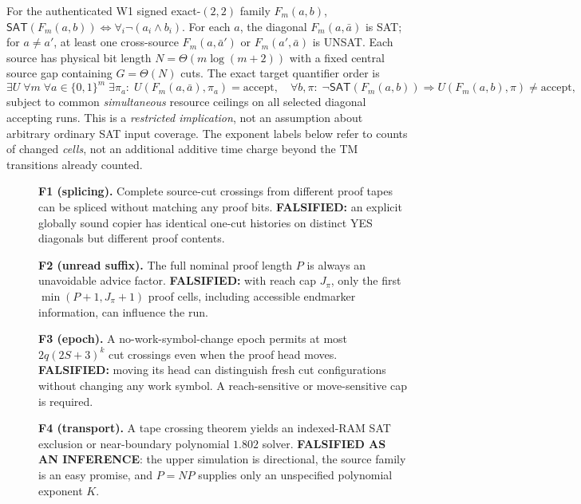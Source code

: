\documentclass[11pt]{article}
\newcommand{\SAT}{\mathsf{SAT}}
\begin{document}
For the authenticated W1 signed exact-$(2,2)$ family $F_m(a,b)$, $\SAT(F_m(a,b))\iff\forall_i\neg(a_i\land b_i)$. For each $a$, the diagonal $F_m(a,\bar a)$ is SAT; for $a\ne a'$, at least one cross-source $F_m(a,\bar a')$ or $F_m(a',\bar a)$ is UNSAT. Each source has physical bit length $N=\Theta(m\log(m+2))$ with a fixed central source gap containing $G=\Theta(N)$ cuts. The exact target quantifier order is
\[
\exists U\;\forall m\;\forall a\in\{0,1\}^m\;\exists\pi_a:\;
U(F_m(a,\bar a),\pi_a)=\mathrm{accept},
\quad \forall b,\pi:\;\neg\SAT(F_m(a,b))\Rightarrow U(F_m(a,b),\pi)\ne\mathrm{accept},
\]
subject to common \emph{simultaneous} resource ceilings on all selected diagonal accepting runs. This is a \emph{restricted implication}, not an assumption about arbitrary ordinary SAT input coverage. The exponent labels below refer to counts of changed \emph{cells}, not an additional additive time charge beyond the TM transitions already counted.

\begin{description}
\item[]\textbf{F1 (splicing).} Complete source-cut crossings from different proof tapes can be spliced without matching any proof bits. \textbf{FALSIFIED:} an explicit globally sound copier has identical one-cut histories on distinct YES diagonals but different proof contents.
\item[]\textbf{F2 (unread suffix).} The full nominal proof length $P$ is always an unavoidable advice factor. \textbf{FALSIFIED:} with reach cap $J_\pi$, only the first $\min(P+1,J_\pi+1)$ proof cells, including accessible endmarker information, can influence the run.
\item[]\textbf{F3 (epoch).} A no-work-symbol-change epoch permits at most $2q(2S+3)^k$ cut crossings even when the proof head moves. \textbf{FALSIFIED:} moving its head can distinguish fresh cut configurations without changing any work symbol. A reach-sensitive or move-sensitive cap is required.
\item[]\textbf{F4 (transport).} A tape crossing theorem yields an indexed-RAM SAT exclusion or near-boundary polynomial $1.802$ solver. \textbf{FALSIFIED AS AN INFERENCE}: the upper simulation is directional, the source family is an easy promise, and $P=NP$ supplies only an unspecified polynomial exponent $K$.
\end{description}
\end{document}
